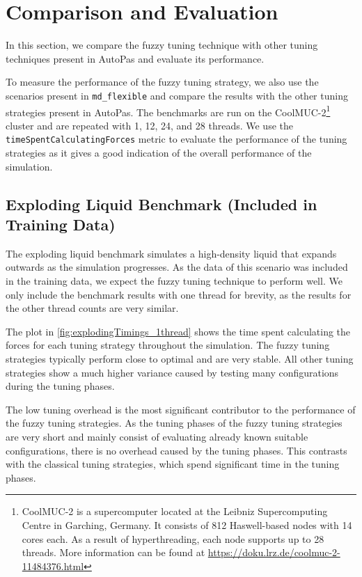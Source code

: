 \chapter{Comparison and Evaluation}
\label{sec:comparison_and_evaluation}

In this section, we compare the fuzzy tuning technique with other tuning techniques present in AutoPas and evaluate its performance.

To measure the performance of the fuzzy tuning strategy, we also use the scenarios present in \texttt{md\_flexible} and compare the results with the other tuning strategies present in AutoPas. The benchmarks are run on the CoolMUC-2\footnote{\label{CoolMucSpecs}CoolMUC-2 is a supercomputer located at the Leibniz Supercomputing Centre in Garching, Germany. It consists of 812 Haswell-based nodes with 14 cores each. As a result of hyperthreading, each node supports up to 28 threads. More information can be found at \url{https://doku.lrz.de/coolmuc-2-11484376.html}} cluster and are repeated with 1, 12, 24, and 28 threads. We use the \texttt{timeSpentCalculatingForces} metric to evaluate the performance of the tuning strategies as it gives a good indication of the overall performance of the simulation.


\section{Exploding Liquid Benchmark (Included in Training Data)}
\label{sec:explodingLiquidBenchmark}

The exploding liquid benchmark simulates a high-density liquid that expands outwards as the simulation progresses. As the data of this scenario was included in the training data, we expect the fuzzy tuning technique to perform well. We only include the benchmark results with one thread for brevity, as the results for the other thread counts are very similar.

The plot in \autoref{fig:explodingTimings_1thread} shows the time spent calculating the forces for each tuning strategy throughout the simulation. The fuzzy tuning strategies typically perform close to optimal and are very stable. All other tuning strategies show a much higher variance caused by testing many configurations during the tuning phases.

The low tuning overhead is the most significant contributor to the performance of the fuzzy tuning strategies. As the tuning phases of the fuzzy tuning strategies are very short and mainly consist of evaluating already known suitable configurations, there is no overhead caused by the tuning phases. This contrasts with the classical tuning strategies, which spend significant time in the tuning phases.

